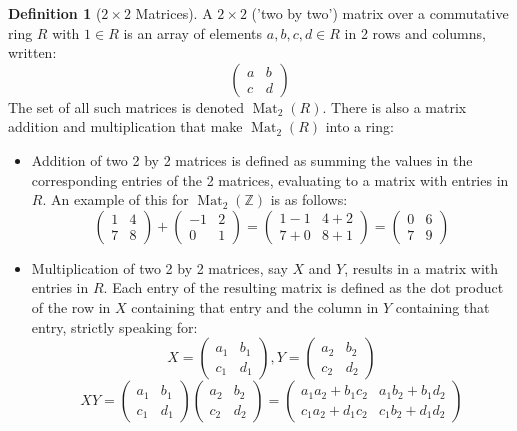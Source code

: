 \documentclass{article}
\theoremstyle{definition}
\newtheorem{definition}{Definition}[section]
\theoremstyle{definition}
\theoremstyle{definition}
\newcommand{\mat}{\operatorname{Mat}}
\newcommand{\Z}{\mathbb{Z}}
\newcommand{\Mabcd}{\begin{pmatrix} a&b\\c&d \end{pmatrix}}
\begin{document}
\begin{definition}[$2\times2$ Matrices]
    A $2\times2$ ('two by two') matrix over a commutative ring $R$ with $1\in R$ is an array of elements $a,b,c,d\in R$ in 2 rows and columns, written: $$\Mabcd$$
    The set of all such matrices is denoted $\mat_2(R)$. There is also a matrix addition and multiplication that make $\mat_2(R)$ into a ring:
    \begin{itemize}
        \item Addition of two 2 by 2 matrices is defined as summing the values in the corresponding entries of the 2 matrices, evaluating to a matrix with entries in $R$. An example of this for $\mat_2(\Z)$ is as follows: $$\begin{pmatrix} 1&4\\7&8 \end{pmatrix}+\begin{pmatrix} -1&2\\0&1 \end{pmatrix}=\begin{pmatrix} {1-1}&{4+2}\\{7+0}&{8+1}\end{pmatrix}=\begin{pmatrix} 0&6\\7&9\end{pmatrix}$$
        \item Multiplication of two 2 by 2 matrices, say $X$ and $Y$, results in a matrix with entries in $R$. Each entry of the resulting matrix is defined as the dot product of the row in $X$ containing that entry and the column in $Y$ containing that entry, strictly speaking for:$$X=\begin{pmatrix} {a_1}&{b_1}\\{c_1}&{d_1} \end{pmatrix},Y=\begin{pmatrix} {a_2}&{b_2}\\{c_2}&{d_2} \end{pmatrix}$$ $$X Y=\begin{pmatrix} {a_1}&{b_1}\\{c_1}&{d_1} \end{pmatrix}\begin{pmatrix} {a_2}&{b_2}\\{c_2}&{d_2} \end{pmatrix}=\begin{pmatrix} {a_1a_2+b_1c_2}&{a_1b_2+b_1d_2}\\{c_1a_2+d_1c_2}&{c_1b_2+d_1d_2} \end{pmatrix}$$

\end{itemize}
\end{definition}
\end{document}
